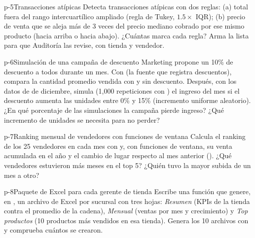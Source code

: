 \begin{ejercicio}{p-5}{Transacciones atípicas}
Detecta transacciones atípicas con dos reglas: (a) total fuera del rango
intercuartílico ampliado (regla de Tukey, $1.5 \times$ IQR); (b) precio de
venta que se aleja más de 3 veces del precio mediano cobrado por ese mismo
producto (hacia arriba o hacia abajo). ¿Cuántas marca cada regla? Arma la
lista para que Auditoría las revise, con tienda y vendedor.
\end{ejercicio}

\begin{ejercicio}{p-6}{Simulación de una campaña de descuento}
Marketing propone un 10\% de descuento a todos durante un mes. Con
 (la fuente que registra descuentos), compara la
cantidad promedio vendida con y sin descuento. Después, con los datos de
 de diciembre, simula (1,000 repeticiones con
) el ingreso del mes si el descuento aumenta las
unidades entre 0\% y 15\% (incremento uniforme aleatorio). ¿En qué
porcentaje de las simulaciones la campaña pierde ingreso? ¿Qué incremento de
unidades se necesita para no perder?
\end{ejercicio}

\begin{ejercicio}{p-7}{Ranking mensual de vendedores con funciones de ventana}
Calcula el ranking de los 25 vendedores en cada mes con
 y, con funciones de ventana, su venta acumulada en el
año y el cambio de lugar respecto al mes anterior (). ¿Qué
vendedores estuvieron más meses en el top 5? ¿Quién tuvo la mayor subida de
un mes a otro?
\end{ejercicio}

\begin{ejercicio}{p-8}{Paquete de Excel para cada gerente de tienda}
Escribe una función  que genere, en
, un archivo de Excel por sucursal con tres
hojas: \emph{Resumen} (KPIs de la tienda contra el promedio de la cadena),
\emph{Mensual} (ventas por mes y crecimiento) y \emph{Top productos} (10
productos más vendidos en esa tienda). Genera los 10 archivos con
 y comprueba cuántos se crearon.
\end{ejercicio}
